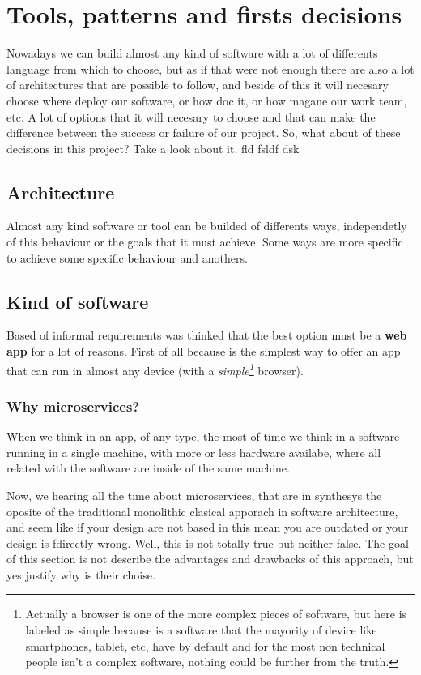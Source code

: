 \chapter{Tools, patterns and firsts decisions}

Nowadays we can build almost any kind of software with a lot of differents
language from which to choose, but as if that were not enough there
are also a lot of architectures that are possible to follow, and beside
of this it will necesary choose where deploy our software, or how
doc it, or how magane our work team, etc. A lot of options that it
will necesary to choose and that can make the difference between the
success or failure of our project. So, what about of these decisions
in this project? Take a look about it.
fld fsldf dsk

\section{Architecture}

Almost any kind software or tool can be builded of differents ways, independetly
of this behaviour or the goals that it must achieve. Some ways are more specific
to achieve some specific behaviour and anothers.

\section{Kind of software}
Based of informal requirements was thinked that the best option must be a \textbf{web app} for a lot of reasons. First of all because is the simplest way to offer an app that can run in almost any device (with a \textit{simple\footnote{Actually a browser is one of the more complex pieces of software, but here is labeled as simple because is a software that the mayority of device like smartphones, tablet, etc, have by default and for the most non technical people isn't a complex software, nothing could be further from the truth.}} browser).

\subsection{Why microservices?}

When we think in an app, of any type, the most of time we think in a software
running in a single machine, with more or less hardware availabe, where all
related with the software are inside of the same machine.

Now, we hearing all the time about microservices, that are in synthesys the
oposite of the traditional monolithic clasical apporach in software architecture,
and seem like if your design are not based in this mean you are outdated or your
design is fdirectly wrong.
Well, this is not totally true but neither false. The goal of this section is
not describe the advantages and drawbacks of this approach, but yes justify why
is their choise.

